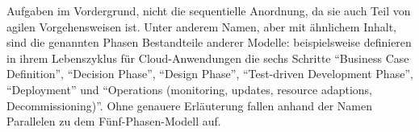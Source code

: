 Aufgaben im Vordergrund, nicht die sequentielle Anordnung, da sie auch Teil 
von agilen Vorgehensweisen ist. 
Unter anderem Namen, aber mit ähnlichem Inhalt, sind die genannten Phasen 
Bestandteile anderer Modelle: 
 beispielsweise 
definieren in ihrem Lebenszyklus für Cloud-Anwendungen die sechs Schritte 
"`Business Case Definition"', "`Decision Phase"', "`Design Phase"', 
"`Test-driven Development Phase"', "`Deployment"' und "`Operations (monitoring, 
updates, resource adaptions, Decommissioning)"'. Ohne genauere Erläuterung 
fallen anhand der Namen Parallelen zu dem Fünf-Phasen-Modell auf.

